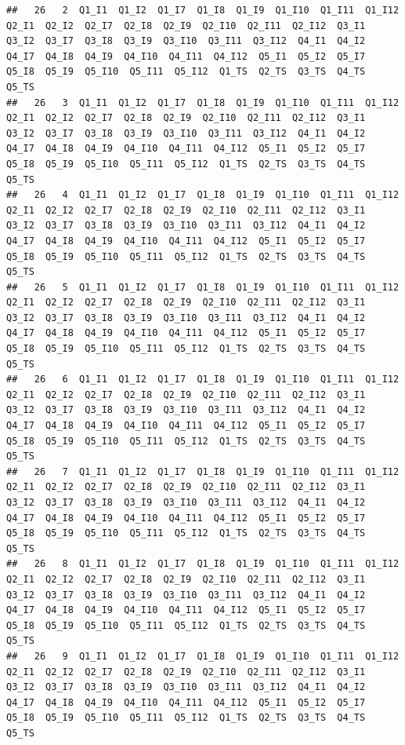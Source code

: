 \documentclass[
]{book}
\begin{document}
\begin{verbatim}
##   26   2  Q1_I1  Q1_I2  Q1_I7  Q1_I8  Q1_I9  Q1_I10  Q1_I11  Q1_I12  Q2_I1  Q2_I2  Q2_I7  Q2_I8  Q2_I9  Q2_I10  Q2_I11  Q2_I12  Q3_I1  Q3_I2  Q3_I7  Q3_I8  Q3_I9  Q3_I10  Q3_I11  Q3_I12  Q4_I1  Q4_I2  Q4_I7  Q4_I8  Q4_I9  Q4_I10  Q4_I11  Q4_I12  Q5_I1  Q5_I2  Q5_I7  Q5_I8  Q5_I9  Q5_I10  Q5_I11  Q5_I12  Q1_TS  Q2_TS  Q3_TS  Q4_TS  Q5_TS
##   26   3  Q1_I1  Q1_I2  Q1_I7  Q1_I8  Q1_I9  Q1_I10  Q1_I11  Q1_I12  Q2_I1  Q2_I2  Q2_I7  Q2_I8  Q2_I9  Q2_I10  Q2_I11  Q2_I12  Q3_I1  Q3_I2  Q3_I7  Q3_I8  Q3_I9  Q3_I10  Q3_I11  Q3_I12  Q4_I1  Q4_I2  Q4_I7  Q4_I8  Q4_I9  Q4_I10  Q4_I11  Q4_I12  Q5_I1  Q5_I2  Q5_I7  Q5_I8  Q5_I9  Q5_I10  Q5_I11  Q5_I12  Q1_TS  Q2_TS  Q3_TS  Q4_TS  Q5_TS
##   26   4  Q1_I1  Q1_I2  Q1_I7  Q1_I8  Q1_I9  Q1_I10  Q1_I11  Q1_I12  Q2_I1  Q2_I2  Q2_I7  Q2_I8  Q2_I9  Q2_I10  Q2_I11  Q2_I12  Q3_I1  Q3_I2  Q3_I7  Q3_I8  Q3_I9  Q3_I10  Q3_I11  Q3_I12  Q4_I1  Q4_I2  Q4_I7  Q4_I8  Q4_I9  Q4_I10  Q4_I11  Q4_I12  Q5_I1  Q5_I2  Q5_I7  Q5_I8  Q5_I9  Q5_I10  Q5_I11  Q5_I12  Q1_TS  Q2_TS  Q3_TS  Q4_TS  Q5_TS
##   26   5  Q1_I1  Q1_I2  Q1_I7  Q1_I8  Q1_I9  Q1_I10  Q1_I11  Q1_I12  Q2_I1  Q2_I2  Q2_I7  Q2_I8  Q2_I9  Q2_I10  Q2_I11  Q2_I12  Q3_I1  Q3_I2  Q3_I7  Q3_I8  Q3_I9  Q3_I10  Q3_I11  Q3_I12  Q4_I1  Q4_I2  Q4_I7  Q4_I8  Q4_I9  Q4_I10  Q4_I11  Q4_I12  Q5_I1  Q5_I2  Q5_I7  Q5_I8  Q5_I9  Q5_I10  Q5_I11  Q5_I12  Q1_TS  Q2_TS  Q3_TS  Q4_TS  Q5_TS
##   26   6  Q1_I1  Q1_I2  Q1_I7  Q1_I8  Q1_I9  Q1_I10  Q1_I11  Q1_I12  Q2_I1  Q2_I2  Q2_I7  Q2_I8  Q2_I9  Q2_I10  Q2_I11  Q2_I12  Q3_I1  Q3_I2  Q3_I7  Q3_I8  Q3_I9  Q3_I10  Q3_I11  Q3_I12  Q4_I1  Q4_I2  Q4_I7  Q4_I8  Q4_I9  Q4_I10  Q4_I11  Q4_I12  Q5_I1  Q5_I2  Q5_I7  Q5_I8  Q5_I9  Q5_I10  Q5_I11  Q5_I12  Q1_TS  Q2_TS  Q3_TS  Q4_TS  Q5_TS
##   26   7  Q1_I1  Q1_I2  Q1_I7  Q1_I8  Q1_I9  Q1_I10  Q1_I11  Q1_I12  Q2_I1  Q2_I2  Q2_I7  Q2_I8  Q2_I9  Q2_I10  Q2_I11  Q2_I12  Q3_I1  Q3_I2  Q3_I7  Q3_I8  Q3_I9  Q3_I10  Q3_I11  Q3_I12  Q4_I1  Q4_I2  Q4_I7  Q4_I8  Q4_I9  Q4_I10  Q4_I11  Q4_I12  Q5_I1  Q5_I2  Q5_I7  Q5_I8  Q5_I9  Q5_I10  Q5_I11  Q5_I12  Q1_TS  Q2_TS  Q3_TS  Q4_TS  Q5_TS
##   26   8  Q1_I1  Q1_I2  Q1_I7  Q1_I8  Q1_I9  Q1_I10  Q1_I11  Q1_I12  Q2_I1  Q2_I2  Q2_I7  Q2_I8  Q2_I9  Q2_I10  Q2_I11  Q2_I12  Q3_I1  Q3_I2  Q3_I7  Q3_I8  Q3_I9  Q3_I10  Q3_I11  Q3_I12  Q4_I1  Q4_I2  Q4_I7  Q4_I8  Q4_I9  Q4_I10  Q4_I11  Q4_I12  Q5_I1  Q5_I2  Q5_I7  Q5_I8  Q5_I9  Q5_I10  Q5_I11  Q5_I12  Q1_TS  Q2_TS  Q3_TS  Q4_TS  Q5_TS
##   26   9  Q1_I1  Q1_I2  Q1_I7  Q1_I8  Q1_I9  Q1_I10  Q1_I11  Q1_I12  Q2_I1  Q2_I2  Q2_I7  Q2_I8  Q2_I9  Q2_I10  Q2_I11  Q2_I12  Q3_I1  Q3_I2  Q3_I7  Q3_I8  Q3_I9  Q3_I10  Q3_I11  Q3_I12  Q4_I1  Q4_I2  Q4_I7  Q4_I8  Q4_I9  Q4_I10  Q4_I11  Q4_I12  Q5_I1  Q5_I2  Q5_I7  Q5_I8  Q5_I9  Q5_I10  Q5_I11  Q5_I12  Q1_TS  Q2_TS  Q3_TS  Q4_TS  Q5_TS

\end{verbatim}
\end{document}
